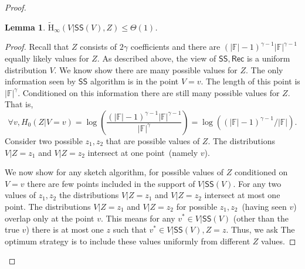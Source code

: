 \documentclass[11pt]{article}
\newcommand{\class}[1]{{\ensuremath{\mathsf{#1}}}}
\newcommand{\sketch}{\ensuremath{\class{SS}}\xspace}
\newcommand{\rec}{\ensuremath{\class{Rec}}\xspace}
\newcommand{\Hav}{\tilde{\mathrm{H}}_\infty}
\newtheorem{lemma}[theorem]{Lemma}
\begin{document}
\begin{proof}
\begin{lemma}
\label{lem:side info determines sketch}
$\Hav(V | \sketch(V), Z) \le \Theta(1)$.
\end{lemma}
\begin{proof}
Recall that $Z$ consists of $2\gamma$ coefficients and there are $(|\mathbb{F}|-1)^{\gamma-1} |\mathbb{F}|^{\gamma-1}$ equally likely values for $Z$.
 As described above, the view of $\sketch, \rec$ is a uniform distribution $V$.  We know show there are many possible values for $Z$.  The only information seen by $\sketch$ algorithm is in the point $V=v$.  The length of this point is $|\mathbb{F}|^\gamma$.  Conditioned on this information there are still many possible values for $Z$.  That is, 
 \[
 \forall v, H_0(Z | V=v) =\log \left(\frac{(|\mathbb{F}|-1)^{\gamma-1} |\mathbb{F}|^{\gamma-1}}{|\mathbb{F}|^\gamma}\right) = \log \left( (|\mathbb{F}|-1)^{\gamma-1}/|\mathbb{F}|\right).
 \]
Consider two possible $z_1, z_2$ that are possible values of $Z$.  The distributions $V| Z=z_1$ and $V | Z=z_2$ intersect at one point~(namely $v$).  

We now show for any sketch algorithm, for possible values of $Z$ conditioned on $V=v$ there are few points included in the support of $V |\sketch(V)$.  For any two values of $z_1, z_2$ the distributions $V| Z= z_1$ and $V | Z=z_2$ intersect at most one point.  The distributions $V | Z=z_1$ and $V| Z=z_2$ for possible $z_1, z_2$~(having seen $v$) overlap only at the point $v$.  This means for any $v^*\in V| \sketch(V)$ (other than the true $v$) there is at most one $z$ such that $v^*\in V | \sketch(V), Z=z$.  Thus, we ask The optimum strategy is to include these values uniformly from different $Z$ values.


\end{proof}
\end{proof}
\end{document}
